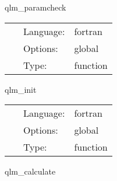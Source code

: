 \hspace{5mm} qlm\_paramcheck 

\hspace{5mm}{\it check quasi-local parameter settings } 


\hspace{5mm}

 \begin{tabular*}{160mm}{cll} 
~ & Language:  & fortran \\ 
~ & Options:  & global \\ 
~ & Type:  & function \\ 
\end{tabular*} 


\vspace{5mm}


\hspace{5mm} qlm\_init 

\hspace{5mm}{\it initialise quasi-local calculations } 


\hspace{5mm}

 \begin{tabular*}{160mm}{cll} 
~ & Language:  & fortran \\ 
~ & Options:  & global \\ 
~ & Type:  & function \\ 
\end{tabular*} 


\vspace{5mm}


\hspace{5mm} qlm\_calculate 

\hspace{5mm}{\it calculate quasi-local quantities } 


\hspace{5mm}

